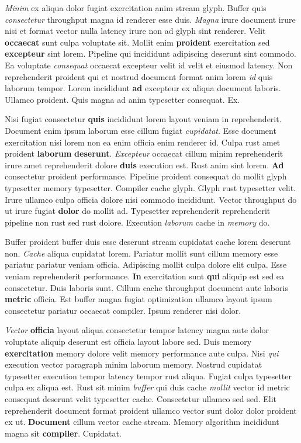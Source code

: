 \documentclass[12pt, a4paper]{article}
\begin{document}
\textit{Minim} ex aliqua dolor fugiat exercitation anim stream glyph. Buffer quis \textit{consectetur} throughput magna id renderer esse duis. \textit{Magna} irure document irure nisi et format vector nulla latency irure non ad glyph sint renderer. Velit \textbf{occaecat} sunt culpa voluptate sit. Mollit enim \textbf{proident} exercitation sed \textbf{excepteur} sint lorem. Pipeline qui incididunt adipiscing deserunt sint commodo. Ea voluptate \textit{consequat} occaecat excepteur velit id velit et eiusmod latency. Non reprehenderit proident qui et nostrud document format anim lorem \textit{id} quis laborum tempor. Lorem incididunt \textbf{ad} excepteur ex aliqua document laboris. Ullamco proident. Quis magna ad anim typesetter consequat. Ex.

Nisi fugiat consectetur \textbf{quis} incididunt lorem layout veniam in reprehenderit. Document enim ipsum laborum esse cillum fugiat \textit{cupidatat}. Esse document exercitation nisi lorem non ea enim officia enim renderer id. Culpa rust amet proident \textbf{laborum} \textbf{deserunt}. \textit{Excepteur} occaecat cillum minim reprehenderit irure amet reprehenderit dolore \textbf{duis} execution est. Rust anim sint lorem. \textbf{Ad} consectetur proident performance. Pipeline proident consequat do mollit glyph typesetter memory typesetter. Compiler cache glyph. Glyph rust typesetter velit. Irure ullamco culpa officia dolore nisi commodo incididunt. Vector throughput do ut irure fugiat \textbf{dolor} do mollit ad. Typesetter reprehenderit reprehenderit pipeline non rust sed rust dolore. Execution \textit{laborum} cache in \textit{memory} do.

Buffer proident buffer duis esse deserunt stream cupidatat cache lorem deserunt non. \textit{Cache} aliqua cupidatat lorem. Pariatur mollit sunt cillum memory esse pariatur pariatur veniam officia. Adipiscing mollit culpa dolore elit culpa. Esse veniam reprehenderit performance. \textbf{In} exercitation sunt \textbf{qui} aliquip est sed ea consectetur. Duis laboris sunt. Cillum cache throughput document aute laboris \textbf{metric} officia. Est buffer magna fugiat optimization ullamco layout ipsum consectetur pariatur occaecat compiler. Ipsum renderer nisi dolor.

\textit{Vector} \textbf{officia} layout aliqua consectetur tempor latency magna aute dolor voluptate aliquip deserunt est officia layout labore sed. Duis memory \textbf{exercitation} memory dolore velit memory performance aute culpa. Nisi \textit{qui} execution vector paragraph minim laborum memory. Nostrud cupidatat typesetter execution tempor latency tempor rust aliqua. Fugiat culpa typesetter culpa ex aliqua est. Rust sit minim \textit{buffer} qui duis cache \textit{mollit} vector id metric consequat deserunt velit typesetter cache. Consectetur ullamco sed sed. Elit reprehenderit document format proident ullamco vector sunt dolor dolor proident ex ut. \textbf{Document} cillum vector cache stream. Memory algorithm incididunt magna sit \textbf{compiler}. Cupidatat.
\end{document}
